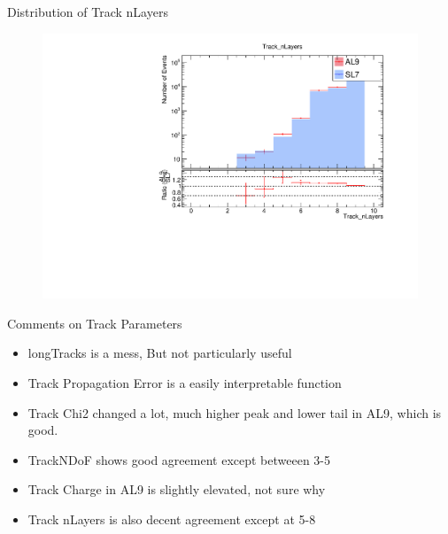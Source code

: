 \begin{frame}{Distribution of Track nLayers}
    \begin{figure}
        \includegraphics[width=\linewidth]{./output/Track_nLayers.pdf}
    \end{figure}
\end{frame}

\begin{frame}{Comments on Track Parameters}
    \begin{itemize}
        \item longTracks  is a mess, But not particularly useful
        \item Track Propagation Error is a easily interpretable function
        \item Track Chi2 changed a lot, much higher peak and lower tail in AL9, which is good.
        \item TrackNDoF shows good agreement except betweeen 3-5
        \item Track Charge in AL9 is slightly elevated, not sure why
        \item Track nLayers is also decent agreement except at 5-8
    \end{itemize}
\end{frame}